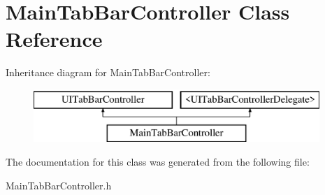 \hypertarget{interface_main_tab_bar_controller}{}\section{Main\+Tab\+Bar\+Controller Class Reference}
\label{interface_main_tab_bar_controller}
Inheritance diagram for Main\+Tab\+Bar\+Controller\+:\begin{figure}[H]
\begin{center}
\leavevmode
\includegraphics[height=2.000000cm]{interface_main_tab_bar_controller}
\end{center}
\end{figure}


The documentation for this class was generated from the following file\+:\begin{DoxyCompactItemize}
\item 
Main\+Tab\+Bar\+Controller.\+h\end{DoxyCompactItemize}
